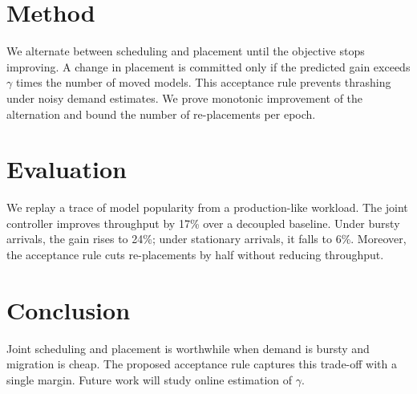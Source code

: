 \documentclass[conference]{IEEEtran}
\begin{document}
\section{Method}
\label{sec:method}
We alternate between scheduling and placement until the objective stops improving.
A change in placement is committed only if the predicted gain exceeds $\gamma$ times the number of moved models.
This acceptance rule prevents thrashing under noisy demand estimates.
We prove monotonic improvement of the alternation and bound the number of re-placements per epoch.

\section{Evaluation}
\label{sec:eval}
We replay a trace of model popularity from a production-like workload.
The joint controller improves throughput by 17\% over a decoupled baseline.
Under bursty arrivals, the gain rises to 24\%; under stationary arrivals, it falls to 6\%.
Moreover, the acceptance rule cuts re-placements by half without reducing throughput.

\section{Conclusion}
\label{sec:conclusion}
Joint scheduling and placement is worthwhile when demand is bursty and migration is cheap.
The proposed acceptance rule captures this trade-off with a single margin.
Future work will study online estimation of $\gamma$.
\end{document}
